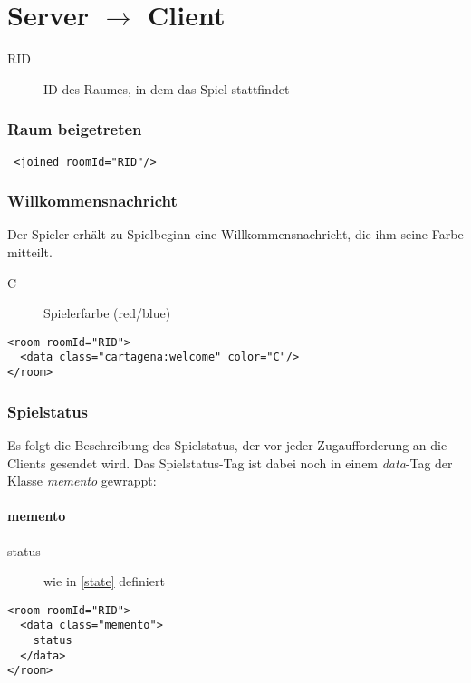 \documentclass[12pt,a4paper, ngerman, oneside]{scrartcl}
\begin{document}
\newpage
\part{Server $\rightarrow$ Client}
\begin{description}
\item[RID] ID des Raumes, in dem das Spiel stattfindet
\end{description}

\section{Raum beigetreten}
 \begin{verbatim}
 <joined roomId="RID"/>
 \end{verbatim}

\section{Willkommensnachricht}
Der Spieler erhält zu Spielbeginn eine Willkommensnachricht, die ihm seine Farbe mitteilt.
\begin{description}
\item[C] Spielerfarbe (red/blue)
\end{description}
\begin{verbatim}
<room roomId="RID">
  <data class="cartagena:welcome" color="C"/>
</room>
\end{verbatim}

\section{Spielstatus}
Es folgt die Beschreibung des Spielstatus, der vor jeder Zugaufforderung an die Clients gesendet wird. Das Spielstatus-Tag ist dabei noch in einem \textit{data}-Tag der Klasse \textit{memento} gewrappt:
\subsection{memento}
\begin{description}
\item[status] wie in \ref{state} definiert
\end{description}
\begin{verbatim}
<room roomId="RID"> 
  <data class="memento"> 
  	status
  </data> 
</room>
\end{verbatim}
\end{document}
